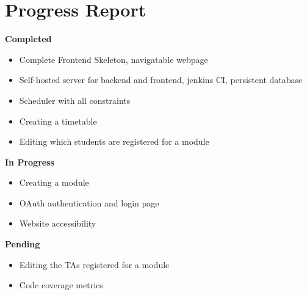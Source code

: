 \section{Progress Report}

\textbf{Completed}
\begin{itemize}
\item Complete Frontend Skeleton, navigatable webpage
\item Self-hosted server for backend and frontend, jenkins CI, persistent database
\item Scheduler with all constraints
\item Creating a timetable
\item Editing which students are registered for a module
\end{itemize}

\textbf{In Progress}
\begin{itemize}
\item Creating a module
\item OAuth authentication and login page 
\item Website accessibility
\end{itemize}

\textbf{Pending}
\begin{itemize}
\item Editing the TAs registered for a module
\item Code coverage metrics
\end{itemize}

